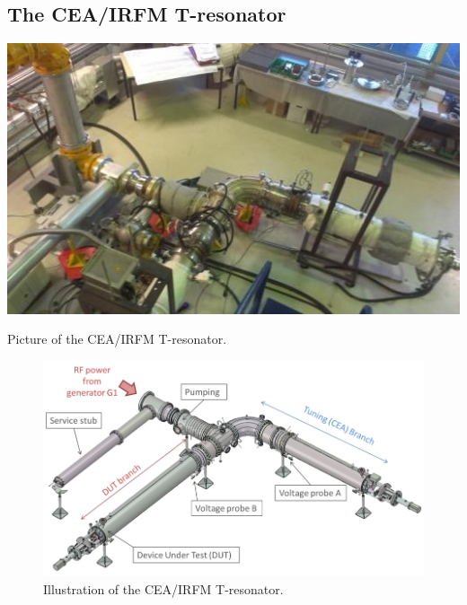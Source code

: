 {\clearpage
\subsection{The CEA/IRFM T-resonator}

\begin{marginfigure}
	\centering
	\includegraphics[width=1.0\linewidth]{figures/chap3/RF_contacts/RF_contact_Tresonator2}
	\caption{Picture of the CEA/IRFM T-resonator.}
	\label{fig:rfcontacttresonator2}
\end{marginfigure}

\begin{figure}[h]
	\centering
	\includegraphics[width=1.0\linewidth]{figures/chap3/RF_contacts/RF_contact_Tresonator_illustration2}
	\caption{Illustration of the CEA/IRFM T-resonator.}
	\label{fig:rfcontacttresonatorillustration2}
\end{figure}

}
